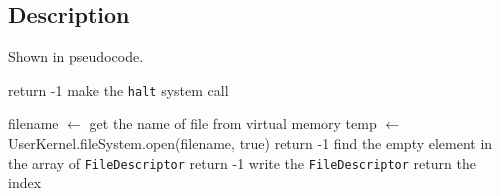 \documentclass{article}
\begin{document}
\subsection{Description}
Shown in pseudocode.
\begin{algorithm}
    \begin{algorithmic}
                \State return -1
            \EndIf
            \State make the \texttt{halt} system call
        \EndProcedure
    \end{algorithmic}
    \begin{algorithmic}
            \State filename $\leftarrow$ get the name of file from virtual memory
            \State temp $\leftarrow$ UserKernel.fileSystem.open(filename, true)
                \State return -1
            \Else
                \State find the empty element in the array of \texttt{FileDescriptor}
                    \State return -1
                \Else
                    \State write the \texttt{FileDescriptor}
                    \State return the index
                \EndIf
            \EndIf
        \EndProcedure
    \end{algorithmic}
\end{algorithm}
\end{document}
